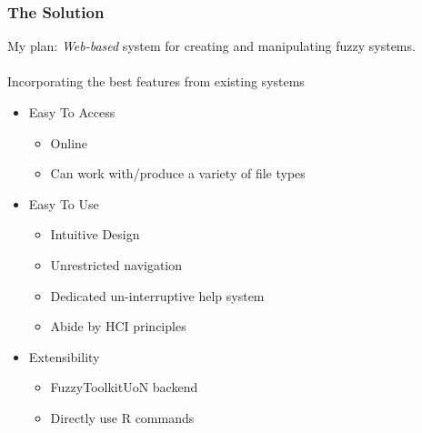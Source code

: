 \documentclass{beamer}
\begin{document}
\begin{frame}
 \frametitle{The Solution}
My plan: 
\pause
\emph{Web-based} system for creating and manipulating fuzzy systems. 
\pause
\ \\
\ \\
Incorporating the best features from existing systems
\pause
	  \begin{itemize}
	  	\item{Easy To Access}
	  	\pause
	  	\begin{itemize}
			\item Online   	  	\pause
			\item Can work with/produce a variety of file types 	  	\pause
		\end{itemize} 
		\item{Easy To Use} 	  	\pause
	  	\begin{itemize}				  
	  		\item Intuitive Design 	  	\pause
  			\item Unrestricted navigation \pause
	  		\item Dedicated un-interruptive help system 	  	\pause
	  		\item Abide by HCI principles 	  	\pause
		\end{itemize}
		\item{Extensibility} 	  	\pause
	  	\begin{itemize}				  		
	  		\item FuzzyToolkitUoN backend 
	  		\pause
	  		\item Directly use R commands
	  	\end{itemize}
	  \end{itemize}
\end{frame}
\end{document}
